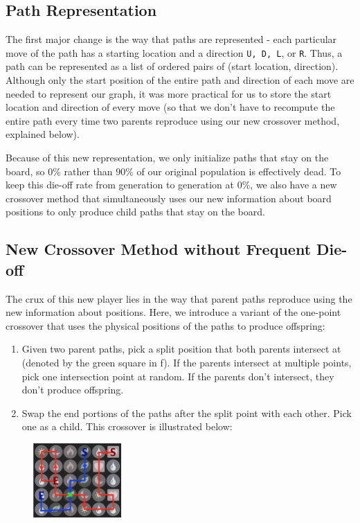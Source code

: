 \documentclass[journal,final,letterpaper,11pt]{IEEEtran}
\begin{document}
\subsection{Path Representation}
The first major change is the way that paths are represented - each particular move of the path has a starting location and a direction \verb+U, D, L+, or \verb+R+. Thus, a path can be represented as a list of ordered pairs of (start location, direction). Although only the start position of the entire path and direction of each move are needed to represent our graph, it was more practical for us to store the start location and direction of every move (so that we don't have to recompute the entire path every time two parents reproduce using our new crossover method, explained below).

Because of this new representation, we only initialize paths that stay on the board, so $0\%$ rather than $90\%$ of our original population is effectively dead. To keep this die-off rate from generation to generation at $0\%$, we also have a new crossover method that simultaneously uses our new information about board positions to only produce child paths that stay on the board. 

\subsection{New Crossover Method without Frequent Die-off}
The crux of this new player lies in the way that parent paths reproduce using the new information about positions. Here, we introduce a variant of the one-point crossover that uses the physical positions of the paths to produce offspring: 

\begin{enumerate}[{i.}]
\item Given two parent paths, pick a split position that both parents intersect at (denoted by the green square in f). If the parents intersect at multiple points, pick one intersection point at random. If the parents don't intersect, they don't produce offspring.
\item Swap the end portions of the paths after the split point with each other. Pick one as a child. This crossover is illustrated below:
\end{enumerate}

\begin{figure}[h]
    \centering
    \includegraphics[width=0.3\textwidth]{before.png}
    \label{fig:before}
\end{figure}
\end{document}
